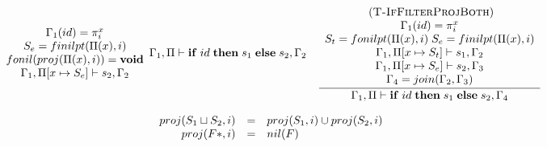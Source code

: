 \documentclass[10pt]{sigplanconf}
\newcommand{\Nil}{\mathbf{nil}}
\newcommand{\mylabel}[1]{\; (\textsc{#1})}
\newcommand{\env}{\Gamma}
\newcommand{\penv}{\Pi}
\newcommand{\subtype}{<:}
\begin{document}
\begin{figure*}[t]
{\[\begin{array}{c}
\begin{array}{c}
{\begin{array}{c}
	\env_{1}(id) = \pi_{i}^{x} \\
	 S_e = finilpt(\Pi(x), i)\\
	fonil(proj(\Pi(x), i)) = {\bf void} \\
	\env_{1}, \penv[x \mapsto S_e] \vdash s_{2}, \env_{2} 
	\end{array}}
{\env_{1}, \penv \vdash \mathbf{if} \; id \; \mathbf{then} \; s_{1} \; \mathbf{else} \; s_{2}, \env_{2}}
\end{array}
\begin{array}{c}
\mylabel{T-IfFilterProjBoth}\\
\dfrac{\begin{array}{c}
	\env_{1}(id) = \pi_{i}^{x} \\ S_t = fonilpt(\Pi(x), i) \; S_e = finilpt(\Pi(x), i)\\
	\env_{1}, \penv[x \mapsto S_t] \vdash s_{1}, \env_{2} \\
	\env_{1}, \penv[x \mapsto S_e] \vdash s_{2}, \env_{3} \\
	\env_{4} = join(\env_{2}, \env_{3}) 
	\end{array}}
{\env_{1}, \penv \vdash \mathbf{if} \; id \; \mathbf{then} \; s_{1} \; \mathbf{else} \; s_{2}, \env_{4}}
\end{array}\\\\
\begin{array}{rcll}
proj(S_1 \sqcup S_2, i) & = & proj(S_1, i) \cup proj(S_2, i) \\
proj(F{*}, i) & = & nil(F) \\

\end{array}
\end{array}\]}
\end{figure*}
\end{document}
